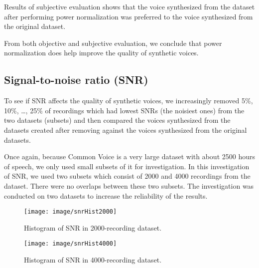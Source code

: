 \documentclass[12pt]{article}
\begin{document}
Results of subjective evaluation shows that the voice synthesized from the dataset after performing power normalization was preferred to the voice synthesized from the original dataset.

From both objective and subjective evaluation, we conclude that power normalization does help improve the quality of synthetic voices.

\subsection{Signal-to-noise ratio (SNR)}
To see if SNR affects the quality of synthetic voices, we increasingly removed 5\%, 10\%, …, 25\% of recordings which had lowest SNRs (the noisiest ones) from the two datasets (subsets) and then compared the voices synthesized from the datasets created after removing against the voices synthesized from the original datasets.

Once again, because Common Voice is a very large dataset with about 2500 hours of speech, we only used small subsets of it for investigation. In this investigation of SNR, we used two subsets which consist of 2000 and 4000 recordings from the dataset. There were no overlaps between these two subsets. The investigation was conducted on two datasets to increase the reliability of the results.

\begin{figure}[t]
\begin{center}
\texttt{[image: image/snrHist2000]}
\end{center}
\vspace{-0.3cm}
\caption[SNR Hist 2000.]{Histogram of SNR in 2000-recording dataset.}
\label{fig_snrHist2000}
\end{figure}

\begin{figure}[t]
\begin{center}
\texttt{[image: image/snrHist4000]}
\end{center}
\vspace{-0.3cm}
\caption[SNR Hist 2000.]{Histogram of SNR in 4000-recording dataset.}
\label{fig_snrHist4000}
\end{figure}
\end{document}
